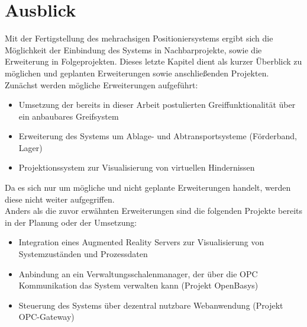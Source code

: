 \documentclass[../../Bachelorarbeit.tex]{subfiles}
\begin{document}
\section{Ausblick}
Mit der Fertigstellung des mehrachsigen Positioniersystems ergibt sich die Möglichkeit der Einbindung des Systems in Nachbarprojekte, sowie die Erweiterung in Folgeprojekten. Dieses letzte Kapitel dient als kurzer Überblick zu möglichen und geplanten Erweiterungen sowie anschließenden Projekten.\\
Zunächst werden mögliche Erweiterungen aufgeführt:

\begin{itemize}
    \item Umsetzung der bereits in dieser Arbeit postulierten Greiffunktionalität über ein anbaubares Greifsystem
    \item Erweiterung des Systems um Ablage- und Abtransportsysteme (\zB Förderband, Lager)
    \item Projektionssystem zur Visualisierung von virtuellen Hindernissen
\end{itemize}

Da es sich nur um mögliche und nicht geplante Erweiterungen handelt, werden diese nicht weiter aufgegriffen.\\
\bigskip \newline
Anders als die zuvor erwähnten Erweiterungen sind die folgenden Projekte bereits in der Planung oder der Umsetzung:

\begin{itemize}
    \item Integration eines Augmented Reality Servers zur Visualisierung von Systemzuständen und Prozessdaten
    \item Anbindung an ein Verwaltungsschalenmanager, der über die OPC Kommunikation das System verwalten kann (Projekt OpenBasys)
    \item Steuerung des Systems über dezentral nutzbare Webanwendung (Projekt OPC-Gateway)
\end{itemize}
\end{document}

